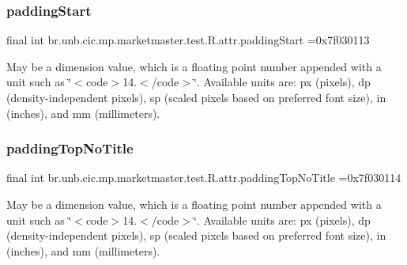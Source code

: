 \subsubsection{\texorpdfstring{padding\+Start}{paddingStart}}
{\footnotesize\ttfamily final int br.\+unb.\+cic.\+mp.\+marketmaster.\+test.\+R.\+attr.\+padding\+Start =0x7f030113\hspace{0.3cm}{\ttfamily [static]}}

May be a dimension value, which is a floating point number appended with a unit such as \char`\"{}$<$code$>$14.\+5sp$<$/code$>$\char`\"{}. Available units are\+: px (pixels), dp (density-\/independent pixels), sp (scaled pixels based on preferred font size), in (inches), and mm (millimeters). \mbox{\label{classbr_1_1unb_1_1cic_1_1mp_1_1marketmaster_1_1test_1_1R_1_1attr_a9011b2a12642131f622f3fe7993ee428}} 
\subsubsection{\texorpdfstring{padding\+Top\+No\+Title}{paddingTopNoTitle}}
{\footnotesize\ttfamily final int br.\+unb.\+cic.\+mp.\+marketmaster.\+test.\+R.\+attr.\+padding\+Top\+No\+Title =0x7f030114\hspace{0.3cm}{\ttfamily [static]}}

May be a dimension value, which is a floating point number appended with a unit such as \char`\"{}$<$code$>$14.\+5sp$<$/code$>$\char`\"{}. Available units are\+: px (pixels), dp (density-\/independent pixels), sp (scaled pixels based on preferred font size), in (inches), and mm (millimeters). \mbox{\label{classbr_1_1unb_1_1cic_1_1mp_1_1marketmaster_1_1test_1_1R_1_1attr_a24f2e9285dd16ba38c8b0a415e55cfbd}} 
